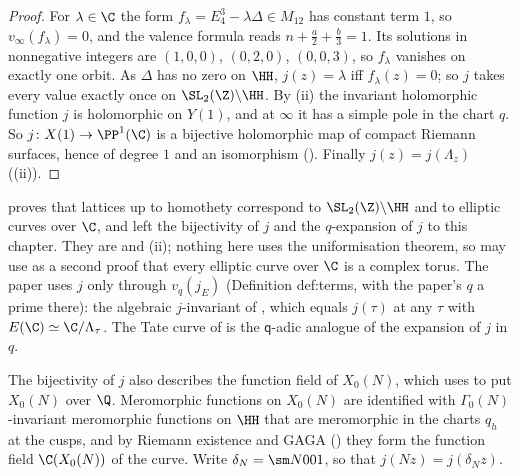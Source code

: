 \begin{proof}
For $\lambda\in\C$ the form $f_\lambda=E_4^3-\lambda\Delta\in M_{12}$ has constant term $1$, so $v_\infty(f_\lambda)=0$, and the valence formula reads $n+\frac a2+\frac b3=1$. Its solutions
in nonnegative integers are $(1,0,0)$, $(0,2,0)$, $(0,0,3)$, so $f_\lambda$ vanishes on exactly one orbit. As $\Delta$ has no zero on $\HH$, $j(z)=\lambda$ iff $f_\lambda(z)=0$; so $j$ takes
every value exactly once on $\SL_2(\Z)\backslash\HH$. By (ii) the invariant holomorphic function $j$ is holomorphic on $Y(1)$, and at $\infty$ it has a
simple pole in the chart $q$. So $j\colon X(1)\to\PP^1(\C)$ is a bijective holomorphic map of compact Riemann surfaces, hence of degree $1$ and an isomorphism ().
Finally $j(z)=j(\Lambda_z)$ ((ii)).
\end{proof}

\begin{paperlink}\label{pl:modforms:ch9}
 proves that lattices up to homothety correspond to $\SL_2(\Z)\backslash\HH$ and to elliptic curves over $\C$, and left the bijectivity of $j$ and the
$q$-expansion of $j$ to this chapter. They are  and (ii); nothing here uses the uniformisation theorem, so
 may use  as a second proof that every elliptic curve over $\C$ is a complex torus. The paper uses $j$ only through
$v_q(j_E)$ (Definition def:terms, with the paper's $q$ a prime there): the algebraic $j$-invariant of , which equals $j(\tau)$ at any $\tau$ with
$E(\C)\simeq\C/\Lambda_\tau$. The Tate curve of  is the $\mathsf q$-adic analogue of the expansion of $j$ in $q$.
\end{paperlink}

The bijectivity of $j$ also describes the function field of $X_0(N)$, which  uses to put $X_0(N)$ over $\Q$. Meromorphic functions on $X_0(N)$ are identified with
$\Gamma_0(N)$-invariant meromorphic functions on $\HH$ that are meromorphic in the charts $q_h$ at the cusps, and by Riemann existence and GAGA () they form the
function field $\C(X_0(N))$ of the curve. Write $\delta_N=\sm N001$, so that $j(Nz)=j(\delta_Nz)$.

